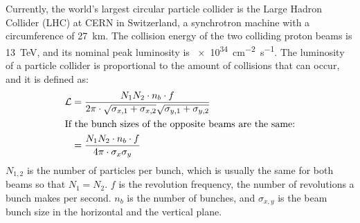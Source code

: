Currently, the world's largest circular particle collider is the Large Hadron Collider (LHC) at CERN in Switzerland, a synchrotron machine with a circumference of \SI{27}{\kilo\meter}.
The collision energy of the two colliding proton beams is \SI{13}{\TeV}, and its nominal peak luminosity \lumi is \SI{e34}{\centi\meter^{-2}\second^{-1}}.
The luminosity of a particle collider is proportional to the amount of collisions that can occur, and it is defined as:
\begin{align}
 \mathcal{L}&=\frac{N_1N_2 \cdot n_b \cdot f}{2\pi \cdot \sqrt{\sigma_{x,1}+\sigma_{x,2}} \sqrt{\sigma_{y,1}+\sigma_{y,2}}}\\
 \intertext{If the bunch sizes of the opposite beams are the same:}
 &=\frac{N_1N_2 \cdot n_b \cdot f}{4\pi \cdot \sigma_x \sigma_y}
\end{align}
$N_{1,2}$ is the number of particles per bunch, which is usually the same for both beams so that $N_1=N_2$.
$f$ is the revolution frequency, the number of revolutions a bunch makes per second.
$n_{b}$ is the number of bunches, and $\sigma_{x,y}$ is the beam bunch size in the horizontal and the vertical plane.
